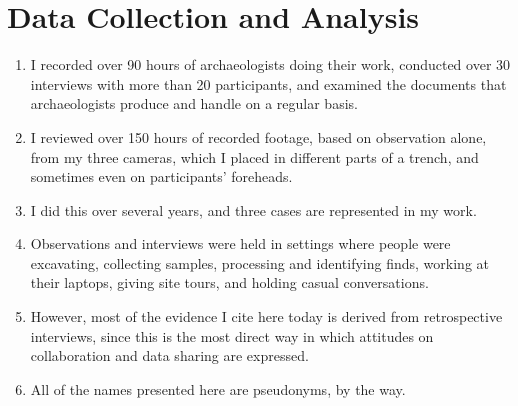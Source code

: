 \documentclass{article}
\begin{document}
\section{Data Collection and Analysis}
\begin{enumerate}
  \item I recorded over 90 hours of archaeologists doing their work, conducted over 30 interviews with more than 20 participants, and examined the documents that archaeologists produce and handle on a regular basis.
  \item I reviewed over 150 hours of recorded footage, based on observation alone, from my three cameras, which I placed in different parts of a trench, and sometimes even on participants' foreheads.
  \item I did this over several years, and three cases are represented in my work.
  \item Observations and interviews were held in settings where people were excavating, collecting samples, processing and identifying finds, working at their laptops, giving site tours, and holding casual conversations.
  \item However, most of the evidence I cite here today is derived from retrospective interviews, since this is the most direct way in which attitudes on collaboration and data sharing are expressed.
  \item All of the names presented here are pseudonyms, by the way.
\end{enumerate}
\end{document}
